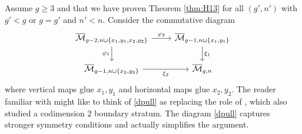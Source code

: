 \documentclass[12pt]{amsart}
\theoremstyle{definition}
\numberwithin{equation}{section}
\newcommand{\M}{\mathcal{M}}
\newcommand{\Mb}{\overline{\M}}
\theoremstyle{definition} %
\theoremstyle{remark}
\begin{document}
Assume $g \geq 3$ and that we have proven Theorem \ref{thm:H13} for all $(g', n')$ with $g' < g$ or $g = g'$ and $n' < n$.  
Consider the commutative diagram
\begin{equation} \label{dpull}
\begin{tikzcd}
\Mb_{g-2, n \cup \{x_1, y_1, x_2, y_2\}}  \arrow{r}{\varphi_2} \arrow{d}[swap]{\varphi_1}  &\Mb_{g-1, n \cup \{x_1, y_1\}} \arrow{d}{\xi_1} \\
\Mb_{g-1, n \cup \{x_2, y_2\}} \arrow{r}[swap]{\xi_2} & \Mb_{g,n}
\end{tikzcd}
\end{equation}
where vertical maps glue $x_1, y_1$ and horizontal maps glue $x_2, y_2$. The reader familiar with \cite{ArbarelloCornalba} might like to think of \eqref{dpull} as  replacing the role of \cite[Equation 4.2]{ArbarelloCornalba}, which also studied a codimension $2$ boundary stratum. The diagram \eqref{dpull} captures stronger symmetry conditions and actually simplifies the argument.
\end{document}
